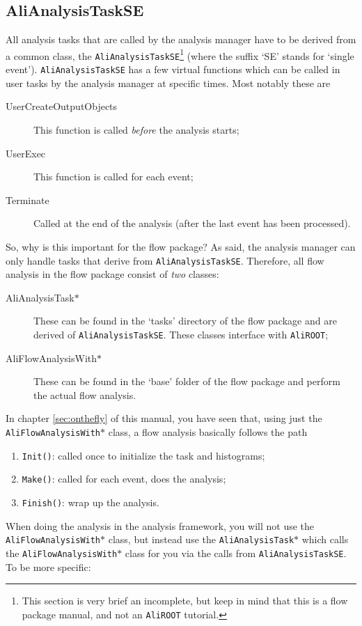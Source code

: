\documentclass[a4paper]{book}
\numberwithin{equation}{subsection}
\begin{document}
\subsection{AliAnalysisTaskSE}
All analysis tasks that are called by the analysis manager have to be derived from a common class, the \texttt{AliAnalysisTaskSE}\footnote{This section is very brief an incomplete, but keep in mind that this is a flow package manual, and not an \texttt{AliROOT} tutorial.} (where the suffix `SE' stands for `single event'). \texttt{AliAnalysisTaskSE} has a few virtual functions which can be called in user tasks by the analysis manager at specific times. Most notably these are
\begin{description}
\item[UserCreateOutputObjects] This function is called \emph{before} the analysis starts;
\item[UserExec] This function is called for each event;
\item[Terminate] Called at the end of the analysis (after the last event has been processed).
\end{description}
So, why is this important for the flow package? As said, the analysis manager can only handle tasks that derive from \texttt{AliAnalysisTaskSE}. Therefore, all flow analysis in the flow package consist of \emph{two} classes:
\begin{description}
\item[AliAnalysisTask$\ast$] These can be found in the `tasks' directory of the flow package and are derived of \texttt{AliAnalysisTaskSE}. These classes interface with \texttt{AliROOT};
\item[AliFlowAnalysisWith$\ast$] These can be found in the `base' folder of the flow package and perform the actual flow analysis.
\end{description}
In chapter \ref{sec:onthefly} of this manual, you have seen that, using just the \texttt{AliFlowAnalysisWith$\ast$} class, a flow analysis basically follows the path
\begin{enumerate}
\item \texttt{Init()}: called once to initialize the task and histograms;
\item \texttt{Make()}: called for each event, does the analysis;
\item \texttt{Finish()}: wrap up the analysis.
\end{enumerate}
When doing the analysis in the analysis framework, you will not use the \texttt{AliFlowAnalysisWith$\ast$} class, but instead use the \texttt{AliAnalysisTask$\ast$} which calls the \texttt{AliFlowAnalysisWith$\ast$} class for you via the calls from \texttt{AliAnalysisTaskSE}. To be more specific:
\end{document}
